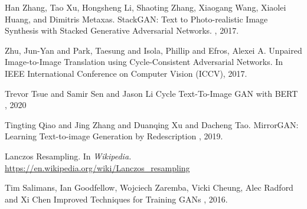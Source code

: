 \documentclass{article}
\begin{document}
	  
	\begin{thebibliography}{1}
		Han Zhang, Tao Xu, Hongsheng Li, Shaoting Zhang, Xiaogang Wang, Xiaolei Huang, and 
		Dimitris Metaxas.
		\newblock StackGAN: Text to Photo-realistic Image Synthesis with Stacked 
		Generative Adversarial Networks.
		, 2017.
		

		Zhu, Jun-Yan and Park, Taesung and Isola, Phillip and Efros, Alexei A.
		\newblock Unpaired Image-to-Image Translation using Cycle-Consistent Adversarial Networks.
		\newblock In IEEE International Conference on Computer Vision (ICCV), 2017.

		Trevor Tsue and Samir Sen and Jason Li
		\newblock Cycle Text-To-Image GAN with BERT
		, 2020
		
		Tingting Qiao and Jing Zhang and Duanqing Xu and Dacheng Tao.
		\newblock MirrorGAN: Learning Text-to-image Generation by Redescription
		, 2019.

		Lanczos Resampling.
		\newblock In {\em Wikipedia.} \url{https://en.wikipedia.org/wiki/Lanczos_resampling}
		
		Tim Salimans, Ian Goodfellow, Wojciech Zaremba, Vicki Cheung, Alec Radford and Xi Chen
		\newblock Improved Techniques for Training GANs
		, 2016.

	\end{thebibliography}
	
	
\end{document}
